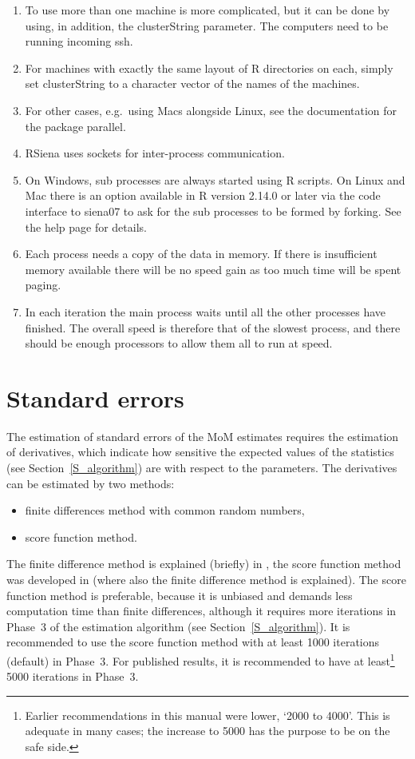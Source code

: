 \documentclass[a4paper,fleqn,11pt]{article}
\newcommand{\+}{\, + \,}
\newcommand{\sfn}[1]{\textsf{#1}}
\newcommand{\R}{{\sf R }}
\newcommand{\RS}{{\sf RSiena }}
\begin{document}
\begin{enumerate}
\item To use more than one machine is more complicated, but it can be done by
  using, in addition, the \sfn{clusterString} parameter.  The computers need to
  be running incoming \sfn{ssh}.
\item For machines with exactly the same layout of \R
  directories on each, simply set \sfn{clusterString} to a character vector of
  the names of the machines.
\item For other cases, e.g.\ using Macs alongside Linux,
  see the documentation for the package \sfn{parallel}.

\item \RS uses sockets for inter-process communication.
\item On Windows, sub processes are always started using \R scripts. On Linux
  and Mac there is an option available in \R version 2.14.0 or later via the
  code interface to \sfn{siena07} to ask for the sub processes to be formed by
  forking. See the help page for details.
\item Each process needs a copy of the data in memory. If there is insufficient
  memory available there will be no speed gain as too much time will be spent
  paging.
\item In each iteration the main process waits until all the other processes
  have finished. The overall speed is therefore that of the slowest process, and
  there should be enough processors to allow them all to run at speed.
\end{enumerate}




\newpage
\hypertarget{T_se}{
\section{Standard errors}
}
\label{S_se}

The estimation of standard errors of the MoM estimates requires
the estimation of derivatives,
which indicate how sensitive the expected values of the statistics
(see Section~\ref{S_algorithm}) are with respect to the parameters.
The derivatives can be estimated by two methods:
\begin{itemize}
\item finite differences method with common random numbers,
\item score function method.
\end{itemize}
The finite difference method is explained (briefly) in \citet{Snijders01},
the score function method was developed in \citet{SchweinbergerSnijders07a}
(where also the finite difference method is explained).
The score function method is preferable, because it is unbiased
and demands less computation time than finite differences,
although it requires more iterations in Phase~3 of the estimation algorithm
(see Section~\ref{S_algorithm}).
It is recommended to use the score function method with
at least 1000 iterations (default) in Phase~3.  For
published results, it is recommended to have at least\footnote{Earlier
recommendations in this manual were lower, `2000 to 4000'.
This is adequate in many cases; the increase to 5000 has the purpose
to be on the safe side.} 5000 iterations in Phase~3.
\end{document}
